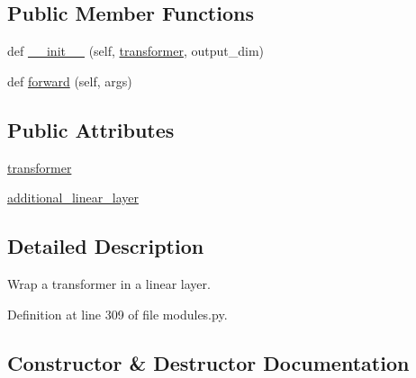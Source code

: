 \subsection*{Public Member Functions}
\begin{DoxyCompactItemize}
\item 
def \hyperlink{classparlai_1_1agents_1_1transformer_1_1modules_1_1TransformerLinearWrapper_a2676a49582292330a7829e235a7cf8f5}{\+\_\+\+\_\+init\+\_\+\+\_\+} (self, \hyperlink{classparlai_1_1agents_1_1transformer_1_1modules_1_1TransformerLinearWrapper_acac2d2f099f07b21f792326f90541ffd}{transformer}, output\+\_\+dim)
\item 
def \hyperlink{classparlai_1_1agents_1_1transformer_1_1modules_1_1TransformerLinearWrapper_a82f571e85719bde36f8fcf09f27d3e4c}{forward} (self, args)
\end{DoxyCompactItemize}
\subsection*{Public Attributes}
\begin{DoxyCompactItemize}
\item 
\hyperlink{classparlai_1_1agents_1_1transformer_1_1modules_1_1TransformerLinearWrapper_acac2d2f099f07b21f792326f90541ffd}{transformer}
\item 
\hyperlink{classparlai_1_1agents_1_1transformer_1_1modules_1_1TransformerLinearWrapper_af083195926e1f091010ecb4c6d409a2a}{additional\+\_\+linear\+\_\+layer}
\end{DoxyCompactItemize}


\subsection{Detailed Description}
\begin{DoxyVerb}Wrap a transformer in a linear layer.\end{DoxyVerb}
 

Definition at line 309 of file modules.\+py.



\subsection{Constructor \& Destructor Documentation}
\mbox{\label{classparlai_1_1agents_1_1transformer_1_1modules_1_1TransformerLinearWrapper_a2676a49582292330a7829e235a7cf8f5}} 
